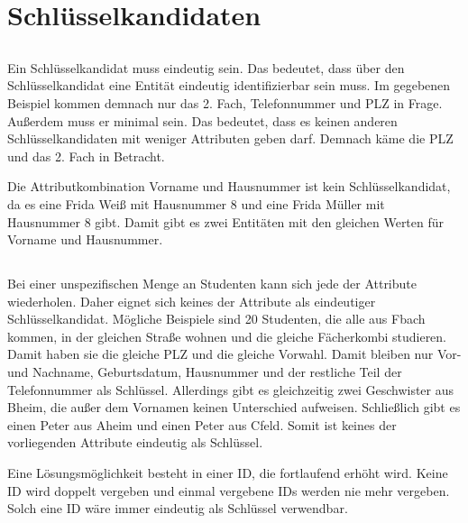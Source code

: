 \documentclass[ngerman]{gdb-aufgabenblatt}
\begin{document}
\section{Schlüsselkandidaten}
	\subsection{} %
		Ein Schlüsselkandidat muss eindeutig sein. Das bedeutet, dass über den Schlüsselkandidat eine Entität eindeutig identifizierbar sein muss. Im gegebenen Beispiel kommen demnach nur das 2. Fach, Telefonnummer und PLZ in Frage. Außerdem muss er minimal sein. Das bedeutet, dass es keinen anderen Schlüsselkandidaten mit weniger Attributen geben darf. Demnach käme die PLZ und das 2. Fach in Betracht.
		
		Die Attributkombination Vorname und Hausnummer ist kein Schlüsselkandidat, da es eine Frida Weiß mit Hausnummer 8 und eine Frida Müller mit Hausnummer 8 gibt. Damit gibt es zwei Entitäten mit den gleichen Werten für Vorname und Hausnummer.
	\subsection{} %
		Bei einer unspezifischen Menge an Studenten kann sich jede der Attribute wiederholen. Daher eignet sich keines der Attribute als eindeutiger Schlüsselkandidat. Mögliche Beispiele sind 20 Studenten, die alle aus Fbach kommen, in der gleichen Straße wohnen und die gleiche Fächerkombi studieren. Damit haben sie die gleiche PLZ und die gleiche Vorwahl. Damit bleiben nur Vor- und Nachname, Geburtsdatum, Hausnummer und der restliche Teil der Telefonnummer als Schlüssel. Allerdings gibt es gleichzeitig zwei Geschwister aus Bheim, die außer dem Vornamen keinen Unterschied aufweisen. Schließlich gibt es einen Peter aus Aheim und einen Peter aus Cfeld. Somit ist keines der vorliegenden Attribute eindeutig als Schlüssel.
		
		Eine Lösungsmöglichkeit besteht in einer ID, die fortlaufend erhöht wird. Keine ID wird doppelt vergeben und einmal vergebene IDs werden nie mehr vergeben. Solch eine ID wäre immer eindeutig als Schlüssel verwendbar.
\end{document}
